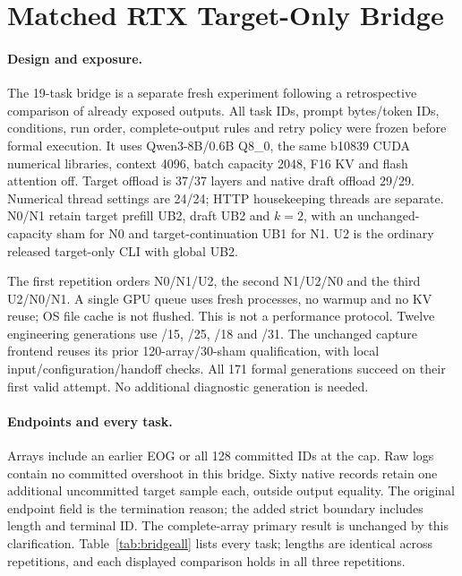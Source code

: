 \section{Matched RTX Target-Only Bridge}
\label{app:bridge}
\paragraph{Design and exposure.}
The 19-task bridge is a separate fresh experiment following a retrospective comparison of already exposed outputs. All task IDs, prompt bytes/token IDs, conditions, run order, complete-output rules and retry policy were frozen before formal execution. It uses Qwen3-8B/0.6B Q8\_0, the same b10839 CUDA numerical libraries, context 4096, batch capacity 2048, F16 KV and flash attention off. Target offload is 37/37 layers and native draft offload 29/29. Numerical thread settings are 24/24; HTTP housekeeping threads are separate. N0/N1 retain target prefill UB2, draft UB2 and $k=2$, with an unchanged-capacity sham for N0 and target-continuation UB1 for N1. U2 is the ordinary released target-only CLI with global UB2.

The first repetition orders N0/N1/U2, the second N1/U2/N0 and the third U2/N0/N1. A single GPU queue uses fresh processes, no warmup and no KV reuse; OS file cache is not flushed. This is not a performance protocol. Twelve engineering generations use /15, /25, /18 and /31. The unchanged capture frontend reuses its prior 120-array/30-sham qualification, with local input/configuration/handoff checks. All 171 formal generations succeed on their first valid attempt. No additional diagnostic generation is needed.

\paragraph{Endpoints and every task.}
Arrays include an earlier EOG or all 128 committed IDs at the cap. Raw logs contain no committed overshoot in this bridge. Sixty native records retain one additional uncommitted target sample each, outside output equality. The original endpoint field is the termination reason; the added strict boundary includes length and terminal ID. The complete-array primary result is unchanged by this clarification. Table~\ref{tab:bridgeall} lists every task; lengths are identical across repetitions, and each displayed comparison holds in all three repetitions.


